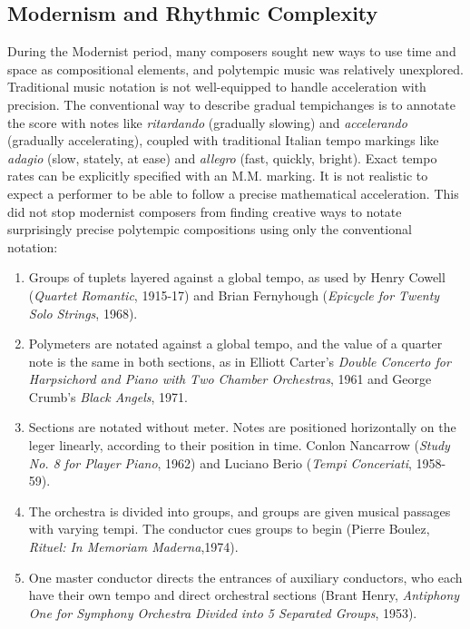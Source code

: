 \subsection{Modernism and Rhythmic Complexity}
\label{sec:modern-rhythm-compl}
During the Modernist period, many composers sought new ways to use
time and space as compositional elements, and polytempic music was
relatively unexplored. Traditional music notation is not well-equipped
to handle acceleration with precision. The conventional way to
describe gradual tempichanges is to annotate the score with notes like
\textit{ritardando} (gradually slowing) and \textit{accelerando}
(gradually accelerating), coupled with traditional Italian tempo
markings like \textit{adagio} (slow, stately, at ease) and
\textit{allegro} (fast, quickly, bright). Exact tempo rates can be
explicitly specified with an M.M.  marking. It is not realistic to
expect a performer to be able to follow a precise mathematical
acceleration. This did not stop modernist composers from finding
creative ways to notate surprisingly precise polytempic compositions
using only the conventional notation:
\begin{enumerate}
\item Groups of tuplets layered against a global tempo, as used by
  Henry Cowell (\textit{Quartet Romantic}, 1915-17) and Brian Fernyhough
  (\textit{Epicycle for Twenty Solo Strings}, 1968).
\item Polymeters are notated against a global tempo, and the value of
  a quarter note is the same in both sections, as in Elliott Carter's \textit{Double
    Concerto for Harpsichord and Piano with Two Chamber Orchestras}, 1961
  and George Crumb's \textit{Black Angels}, 1971.
\item Sections are notated without meter. Notes are positioned
  horizontally on the leger linearly, according to their position in
  time. Conlon Nancarrow (\textit{Study No. 8 for Player Piano},
  1962) and Luciano Berio (\textit{Tempi Conceriati}, 1958-59).
\item The orchestra is divided into groups, and groups are given
  musical passages with varying tempi. The conductor cues groups to
  begin (Pierre Boulez, \textit{Rituel: In Memoriam Maderna},1974).
\item One master conductor directs the entrances of auxiliary
  conductors, who each have their own tempo and direct orchestral
  sections (Brant Henry, \textit{Antiphony
    One for Symphony Orchestra Divided into 5 Separated Groups}, 1953).
\end{enumerate}

